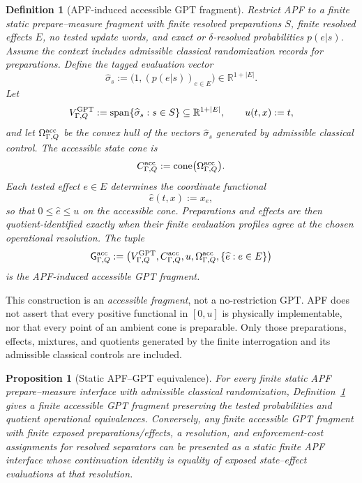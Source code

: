 \documentclass[11pt]{article}
\newtheorem{proposition}[theorem]{Proposition}
\newtheorem{definition}[theorem]{Definition}
\newcommand{\R}{\mathbb R}
\begin{document}
\begin{definition}[APF-induced accessible GPT fragment]\label{def:apf-induced-gpt-fragment}
Restrict APF to a finite static prepare--measure fragment with finite resolved preparations \(S\), finite resolved effects \(E\), no tested update words, and exact or \(\delta\)-resolved probabilities \(p(e|s)\).  Assume the context includes admissible classical randomization records for preparations.  Define the tagged evaluation vector
\[
  \widehat\sigma_s := \bigl(1,(p(e|s))_{e\in E}\bigr)\in\R^{1+|E|}.
\]
Let
\[
  V_{\Gamma,Q}^{\rm GPT}:=\operatorname{span}\{\widehat\sigma_s:s\in S\}\subseteq\R^{1+|E|},
  \qquad
  u(t,x):=t,
\]
and let \(\Omega_{\Gamma,Q}^{\rm acc}\) be the convex hull of the vectors \(\widehat\sigma_s\) generated by admissible classical control.  The accessible state cone is
\[
  C_{\Gamma,Q}^{\rm acc}:=\operatorname{cone}\bigl(\Omega_{\Gamma,Q}^{\rm acc}\bigr).
\]
Each tested effect \(e\in E\) determines the coordinate functional
\[
  \widehat e(t,x):=x_e,
\]
so that \(0\le \widehat e\le u\) on the accessible cone.  Preparations and effects are then quotient-identified exactly when their finite evaluation profiles agree at the chosen operational resolution.  The tuple
\[
  \mathsf G_{\Gamma,Q}^{\rm acc}:=\bigl(V_{\Gamma,Q}^{\rm GPT},C_{\Gamma,Q}^{\rm acc},u,\Omega_{\Gamma,Q}^{\rm acc},\{\widehat e:e\in E\}\bigr)
\]
is the APF-induced accessible GPT fragment.
\end{definition}

This construction is an \emph{accessible fragment}, not a no-restriction GPT.  APF does not assert that every positive functional in \([0,u]\) is physically implementable, nor that every point of an ambient cone is preparable.  Only those preparations, effects, mixtures, and quotients generated by the finite interrogation and its admissible classical controls are included.

\begin{proposition}[Static APF--GPT equivalence]\label{prop:static-apf-gpt-equivalence}
For every finite static APF prepare--measure interface with admissible classical randomization, Definition~\ref{def:apf-induced-gpt-fragment} gives a finite accessible GPT fragment preserving the tested probabilities and quotient operational equivalences.  Conversely, any finite accessible GPT fragment with finite exposed preparations/effects, a resolution, and enforcement-cost assignments for resolved separators can be presented as a static finite APF interface whose continuation identity is equality of exposed state--effect evaluations at that resolution.
\end{proposition}
\end{document}
